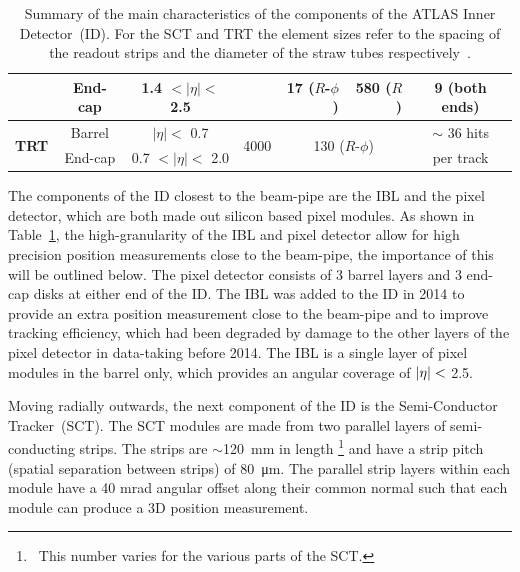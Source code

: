 {\begin{table}[!htb]
\begin{tabular}{|cc||c|c|rr|c|}
                         & End-cap   &        1.4  $\lt |\eta| \lt$  2.5    &                   &  17 ($R$-$\phi$)        & 580 ($R$)          & 9 (both ends)    \\ %
  \hline                                                                                                                                                
  \multirow{2}{*}{\textbf{TRT}}   & Barrel    & $|\eta| \lt$  0.7             & \multirow{2}{*}{4000}     & \multicolumn{2}{c|}{\multirow{2}{*}{130 ($R$-$\phi$)}}     & $\sim$ 36 hits    \\ %
                         & End-cap   &         0.7  $\lt |\eta| \lt$  2.0    &                  &                         &                  & per track        \\ %
  \hline
\end{tabular}
\caption[Summary of the main characteristics of the components of the ATLAS Inner Detector.]
        {\label{tab:det-ID}Summary of the main characteristics of the components of the ATLAS Inner Detector~(ID).
          For the SCT and TRT the element sizes refer to the spacing of the readout strips and the diameter of the straw tubes respectively~\cite{det-ATLAS_Exp,det-ID_table}.}
         \vspace{-1em}
\end{table}
}

The components of the ID closest to the beam-pipe are the IBL and the pixel detector,
which are both made out silicon based pixel modules.
As shown in Table~\ref{tab:det-ID}, the high-granularity of the IBL and pixel detector allow for high precision position measurements
close to the beam-pipe, the importance of this will be outlined below.
The pixel detector consists of 3 barrel layers and 3 end-cap disks at either end of the ID.
The IBL was added to the ID in 2014 to provide an extra position measurement close to the beam-pipe
and to improve tracking efficiency,
which had been degraded by damage to the other layers of the pixel detector in data-taking before 2014.
The IBL is a single layer of pixel modules in the barrel only, which provides an angular coverage of $|\eta|\nobreak<$ 2.5.

Moving radially outwards, the next component of the ID is the Semi-Conductor Tracker~(SCT).
The SCT modules are made from two parallel layers of semi-conducting strips.
The strips are $\sim$\SI{120}{\mm} in length \footnote{\ This number varies for the various parts of the SCT.}
and have a strip pitch (spatial separation between strips) of \SI{80}{\micro\metre}.
The parallel strip layers within each module have a 40 mrad angular offset along their common normal
such that each module can produce a 3D position measurement.

